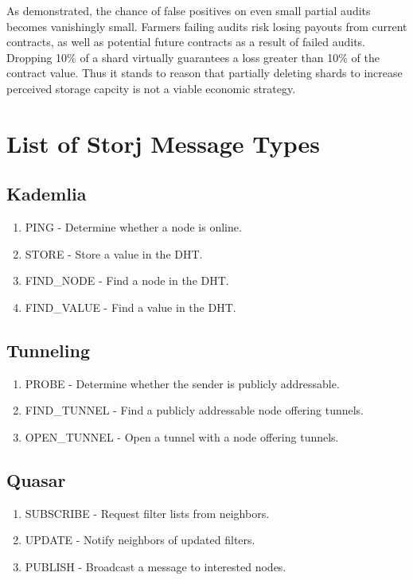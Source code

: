 \documentclass[a4paper,10pt]{article}
\begin{document}
As demonstrated, the chance of false positives on even small partial audits
becomes vanishingly small. Farmers failing audits risk losing payouts from
current contracts, as well as potential future contracts as a result of failed
audits. Dropping 10\% of a shard virtually guarantees a loss greater than 10\%
of the contract value. Thus it stands to reason that partially deleting shards
to increase perceived storage capcity is not a viable economic strategy.

\newpage
\appendix
\section{List of Storj Message Types}
\subsection{Kademlia}
\begin{enumerate}
\item PING - Determine whether a node is online.
\item STORE - Store a value in the DHT.
\item FIND\_NODE - Find a node in the DHT.
\item FIND\_VALUE - Find a value in the DHT.
\setcounter{enumTemp}{\theenumi}
\end{enumerate}
\subsection{Tunneling}
\begin{enumerate}
\setcounter{enumi}{\theenumTemp}
\item PROBE - Determine whether the sender is publicly addressable.
\item FIND\_TUNNEL - Find a publicly addressable node offering tunnels.
\item OPEN\_TUNNEL - Open a tunnel with a node offering tunnels.
\setcounter{enumTemp}{\theenumi}
\end{enumerate}
\subsection{Quasar}
\begin{enumerate}
\setcounter{enumi}{\theenumTemp}
\item SUBSCRIBE - Request filter lists from neighbors.
\item UPDATE - Notify neighbors of updated filters.
\item PUBLISH - Broadcast a message to interested nodes.
\setcounter{enumTemp}{\theenumi}
\end{enumerate}
\end{document}
